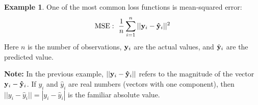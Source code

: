 \documentclass[12pt]{amsart}
\theoremstyle{definition}
\newtheorem*{example}{Example}
\begin{document}
\begin{enumerate}[itemsep=2.5em,leftmargin=0pt]
\begin{example}
    One of the most common loss functions is mean-squared error:
    \[
        \text{MSE}:~ \frac{1}{n} \sum_{i=1}^n ||{\bf y}_i - {\bf \hat{\bf y}}_i ||^2
    \]
    Here $n$ is the number of observations, ${\bf y}_i$ are the actual values, and $\hat{\bf y}_i$ are the predicted value.
\end{example}

\noindent\textbf{Note:} In the previous example, $||{\bf y}_i - {\bf \hat{\bf y}}_i||$ refers to the magnitude of the vector ${\bf y}_i - {\bf \hat{\bf y}}_i$. If ${ y}_i$ and ${ \hat{ y}}_i$ are real numbers (vectors with one component), then $||{ y}_i - { \hat{ y}}_i|| = |{ y}_i - { \hat{ y}}_i|$ is the familiar absolute value.

\vspace{-2em}


\end{enumerate}
\end{document}
